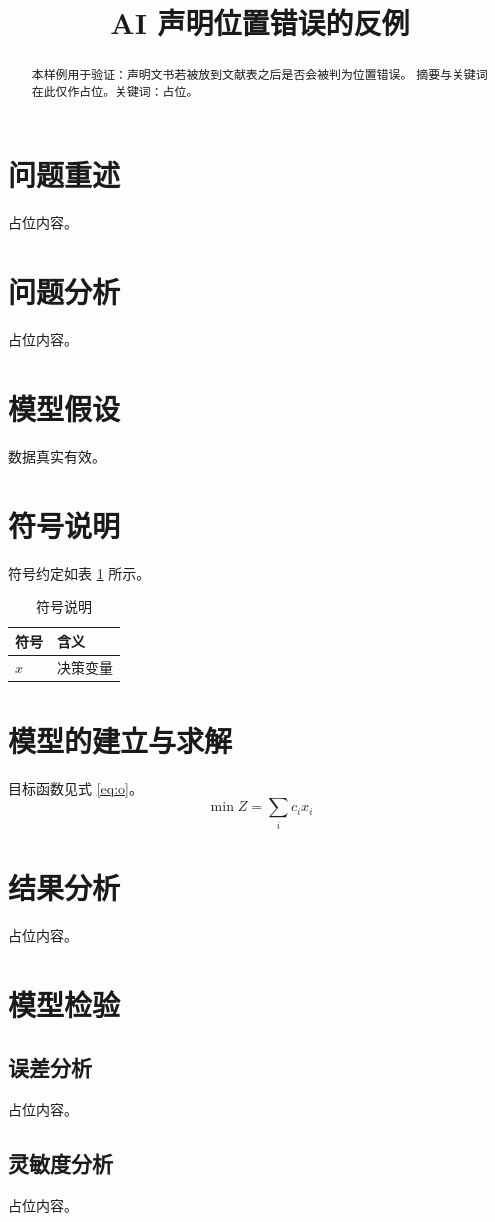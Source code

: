 \documentclass[12pt,a4paper]{ctexart}
\title{AI 声明位置错误的反例}
\author{}
\begin{document}
\maketitle
\clearpage
\begin{abstract}
本样例用于验证：声明文书若被放到文献表之后是否会被判为位置错误。
摘要与关键词在此仅作占位。关键词：占位。
\end{abstract}
\newpage

\section{问题重述}
占位内容。
\section{问题分析}
占位内容。
\section{模型假设}
数据真实有效。
\section{符号说明}
符号约定如表 \ref{tab:s} 所示。
\begin{table}[htbp]
\centering
\caption{符号说明}
\label{tab:s}
\begin{tabular}{ll}
\toprule
符号 & 含义 \\
\midrule
$x$ & 决策变量 \\
\bottomrule
\end{tabular}
\end{table}
\section{模型的建立与求解}
目标函数见式 \eqref{eq:o}。
\begin{equation}
\min Z = \sum_{i} c_i x_i
\label{eq:o}
\end{equation}
\section{结果分析}
占位内容。
\section{模型检验}
\subsection{误差分析}
占位内容。
\subsection{灵敏度分析}
占位内容。
\end{document}
